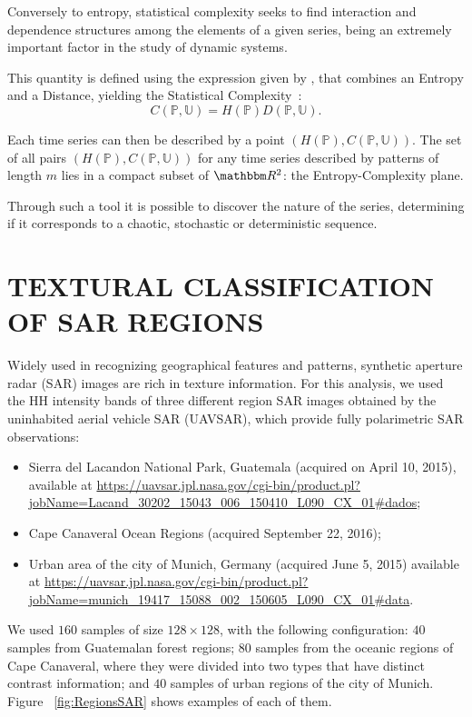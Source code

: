 \documentclass{isprs}
\begin{document}
Conversely to entropy, statistical complexity seeks to find interaction and dependence structures among the elements of a given series, being an extremely important factor in the study of dynamic systems.

This quantity is defined using the expression given by \citet{Lopez1995statistical}, 
that combines an Entropy and a Distance, yielding the Statistical Complexity~\citep{Feldman2008information,Feldman1998Statistical}:
\begin{equation}
C(\mathbb{P}, \mathbb{U}) = H(\mathbb{P}) D(\mathbb{P}, \mathbb{U}).
\end{equation}

Each time series can then be described by a point $(H(\mathbb{P}), C(\mathbb{P}, \mathbb{U}))$.
The set of all pairs $(H(\mathbb{P}), C(\mathbb{P}, \mathbb{U}))$ for any time series described by patterns of length $m$ lies in a compact subset of $\mathbbm R^2$: the Entropy-Complexity plane. 

Through such a tool it is possible to discover the nature of the series, determining if it corresponds to a chaotic, stochastic or deterministic sequence.

\section{TEXTURAL CLASSIFICATION OF SAR REGIONS}\label{SAR}

Widely used in recognizing geographical features and patterns, synthetic aperture radar (SAR) images are rich in texture information.
For this analysis, we used the HH intensity bands of three different region SAR images obtained by the uninhabited aerial vehicle SAR (UAVSAR), which provide fully polarimetric SAR observations:
\begin{itemize}
	\item Sierra del Lacandon National Park, Guatemala (acquired on April 10, 2015), available at \url{https://uavsar.jpl.nasa.gov/cgi-bin/product.pl?jobName=Lacand_30202_15043_006_150410_L090_CX_01#dados};
	\item Cape Canaveral Ocean Regions (acquired September 22, 2016);
	\item Urban area of the city of Munich, Germany (acquired June 5, 2015) available at \url{https://uavsar.jpl.nasa.gov/cgi-bin/product.pl?jobName=munich_19417_15088_002_150605_L090_CX_01#data}.
\end{itemize}

We used $160$ samples of size $128\times128$, with the following configuration:
$40$ samples from Guatemalan forest regions;
$80$ samples from the oceanic regions of Cape Canaveral, where they were divided into two types that have distinct contrast information; and
$40$ samples of urban regions of the city of Munich.
Figure ~\ref{fig:RegionsSAR} shows examples of each of them.
\end{document}
